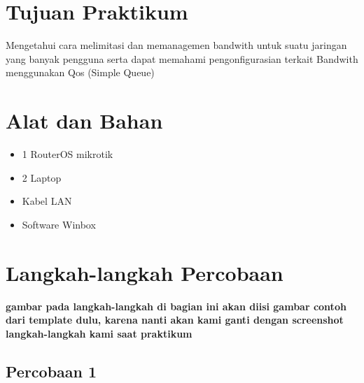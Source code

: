 
\section{Tujuan Praktikum}
Mengetahui cara melimitasi dan memanagemen bandwith untuk suatu jaringan yang banyak pengguna serta dapat memahami pengonfigurasian terkait Bandwith menggunakan Qos (Simple Queue)

\section{Alat dan Bahan}
\begin{itemize}[label=$\bullet$, itemsep=-1pt, leftmargin=*]
	\item 1 RouterOS mikrotik
	\item 2 Laptop
	\item Kabel LAN
	\item Software Winbox
\end{itemize}

\section{Langkah-langkah Percobaan}
\textbf{gambar pada langkah-langkah di bagian ini akan diisi gambar contoh dari template dulu,
		karena nanti akan kami ganti dengan screenshot langkah-langkah kami saat praktikum}

\subsection{Percobaan 1}

